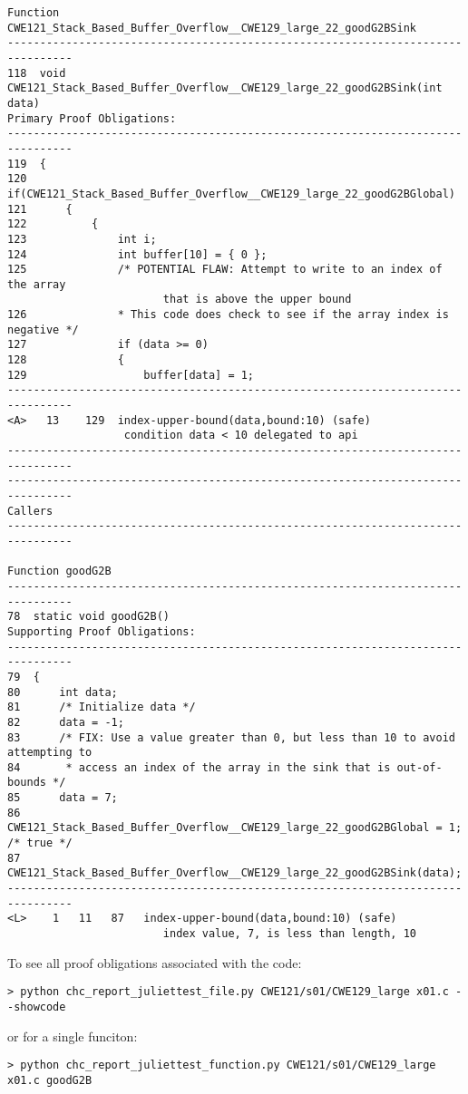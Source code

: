\documentclass[11pt]{article}
\begin{document}
\begin{small}
\begin{verbatim}
Function CWE121_Stack_Based_Buffer_Overflow__CWE129_large_22_goodG2BSink
--------------------------------------------------------------------------------
118  void CWE121_Stack_Based_Buffer_Overflow__CWE129_large_22_goodG2BSink(int data)
Primary Proof Obligations:
--------------------------------------------------------------------------------
119  {
120      if(CWE121_Stack_Based_Buffer_Overflow__CWE129_large_22_goodG2BGlobal)
121      {
122          {
123              int i;
124              int buffer[10] = { 0 };
125              /* POTENTIAL FLAW: Attempt to write to an index of the array 
                        that is above the upper bound
126              * This code does check to see if the array index is negative */
127              if (data >= 0)
128              {
129                  buffer[data] = 1;
--------------------------------------------------------------------------------
<A>   13    129  index-upper-bound(data,bound:10) (safe)
                  condition data < 10 delegated to api
--------------------------------------------------------------------------------
--------------------------------------------------------------------------------
Callers
--------------------------------------------------------------------------------

Function goodG2B
--------------------------------------------------------------------------------
78  static void goodG2B()
Supporting Proof Obligations:
--------------------------------------------------------------------------------
79  {
80      int data;
81      /* Initialize data */
82      data = -1;
83      /* FIX: Use a value greater than 0, but less than 10 to avoid attempting to
84       * access an index of the array in the sink that is out-of-bounds */
85      data = 7;
86      CWE121_Stack_Based_Buffer_Overflow__CWE129_large_22_goodG2BGlobal = 1; /* true */
87      CWE121_Stack_Based_Buffer_Overflow__CWE129_large_22_goodG2BSink(data);
--------------------------------------------------------------------------------
<L>    1   11   87   index-upper-bound(data,bound:10) (safe)
                        index value, 7, is less than length, 10
\end{verbatim}
\end{small}

To see all proof obligations associated with the code:
\begin{verbatim}
> python chc_report_juliettest_file.py CWE121/s01/CWE129_large x01.c --showcode
\end{verbatim}
or for a single funciton:
\begin{verbatim}
> python chc_report_juliettest_function.py CWE121/s01/CWE129_large x01.c goodG2B
\end{verbatim}
\end{document}
